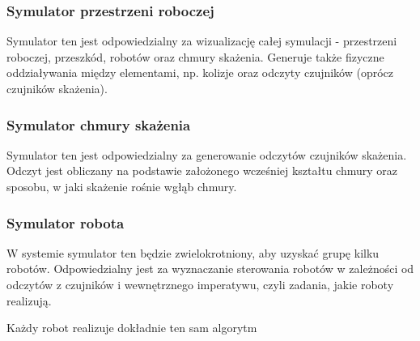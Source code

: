 \documentclass[a4paper, 12pt]{article}
\begin{document}
	\subsubsection{Symulator przestrzeni roboczej}
	Symulator ten jest odpowiedzialny za wizualizację całej symulacji - przestrzeni roboczej, przeszkód, robotów oraz chmury skażenia. Generuje także fizyczne oddziaływania między elementami, np. kolizje oraz odczyty czujników (oprócz czujników skażenia).
	
	\subsubsection{Symulator chmury skażenia}
	Symulator ten jest odpowiedzialny za generowanie odczytów czujników skażenia. Odczyt jest obliczany na podstawie założonego wcześniej kształtu chmury oraz sposobu, w jaki skażenie rośnie wgłąb chmury.
	
	\subsubsection{Symulator robota}
	W systemie symulator ten będzie zwielokrotniony, aby uzyskać grupę kilku robotów. Odpowiedzialny jest za wyznaczanie sterowania robotów w zależności od odczytów z czujników i wewnętrznego imperatywu, czyli zadania, jakie roboty realizują.
	
	Każdy robot realizuje dokładnie ten sam algorytm
	
\end{document}
